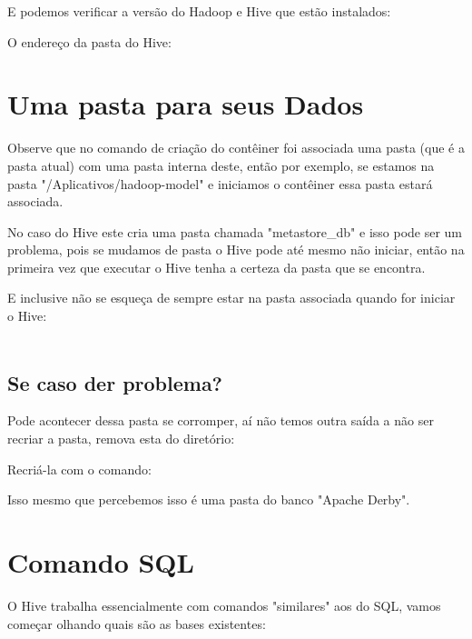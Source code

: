 \documentclass[a4paper,11pt]{article}
\begin{document}


E podemos verificar a versão do Hadoop e Hive que estão instalados: \\

O endereço da pasta do Hive: \\

\section{Uma pasta para seus Dados}
Observe que no comando de criação do contêiner foi associada uma pasta (que é a pasta atual) com uma pasta interna deste, então por exemplo, se estamos na pasta "/Aplicativos/hadoop-model" e iniciamos o contêiner essa pasta estará associada.

No caso do Hive este cria uma pasta chamada "metastore\_db" e isso pode ser um problema, pois se mudamos de pasta o Hive pode até mesmo não iniciar, então na primeira vez que executar o Hive tenha a certeza da pasta que se encontra.

E inclusive não se esqueça de sempre estar na pasta associada quando for iniciar o Hive: \\
 \\

\subsection{Se caso der problema?}
Pode acontecer dessa pasta se corromper, aí não temos outra saída a não ser recriar a pasta, remova esta do diretório: \\

Recriá-la com o comando: \\

Isso mesmo que percebemos isso é uma pasta do banco "Apache Derby".

\section{Comando SQL}
O Hive trabalha essencialmente com comandos "similares" aos do SQL, vamos começar olhando quais são as bases existentes: \\
\end{document}
